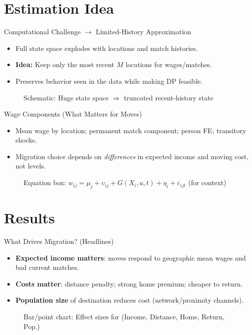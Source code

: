 \documentclass[aspectratio=169,professionalfonts]{beamer}
\newcommand{\hl}[1]{\textbf{\textcolor{UGARed}{#1}}}
\newcommand{\figph}[2][0.9\linewidth]{%
  \begin{figure}
    \centering
    \fbox{\rule{0pt}{0.55#1}\rule{#1}{0pt}}%
    \caption{#2}
  \end{figure}
}
\newcommand{\hl}[1]{\textbf{\color{UGARed}{#1}}}
\newcommand{\figph}[1]{\begin{center}\fbox{\parbox{0.85\linewidth}{\centering \vspace{0.6em} \textit{#1} \vspace{0.6em}}}\end{center}}
\begin{document}
\section{Estimation Idea}

\begin{frame}{Computational Challenge \texorpdfstring{$\rightarrow$}{->} Limited-History Approximation}
  \begin{itemize}
    \item Full state space explodes with locations and match histories.
    \item \hl{Idea:} Keep only the most recent $M$ locations for wages/matches.
    \item Preserves behavior seen in the data while making DP feasible.
  \end{itemize}
  \figph{Schematic: Huge state space $\Rightarrow$ truncated recent-history state}
\end{frame}

\begin{frame}{Wage Components (What Matters for Moves)}
  \begin{itemize}
    \item Mean wage by location; permanent match component; person FE; transitory shocks.
    \item Migration choice depends on \textit{differences} in expected income and moving cost, not levels.
  \end{itemize}
  \figph{Equation box: $w_{ij}= \mu_j + \upsilon_{ij} + G(X_{i},a,t) + \eta_i + \varepsilon_{ijt}$ (for context)}
\end{frame}

\section{Results}

\begin{frame}{What Drives Migration? (Headlines)}
  \begin{itemize}
    \item \hl{Expected income matters}: moves respond to geographic mean wages and bad current matches.
    \item \hl{Costs matter}: distance penalty; strong home premium; cheaper to return.
    \item \hl{Population size} of destination reduces cost (network/proximity channels).
  \end{itemize}
  \figph{Bar/point chart: Effect sizes for (Income, Distance, Home, Return, Pop.)}
\end{frame}
\end{document}
